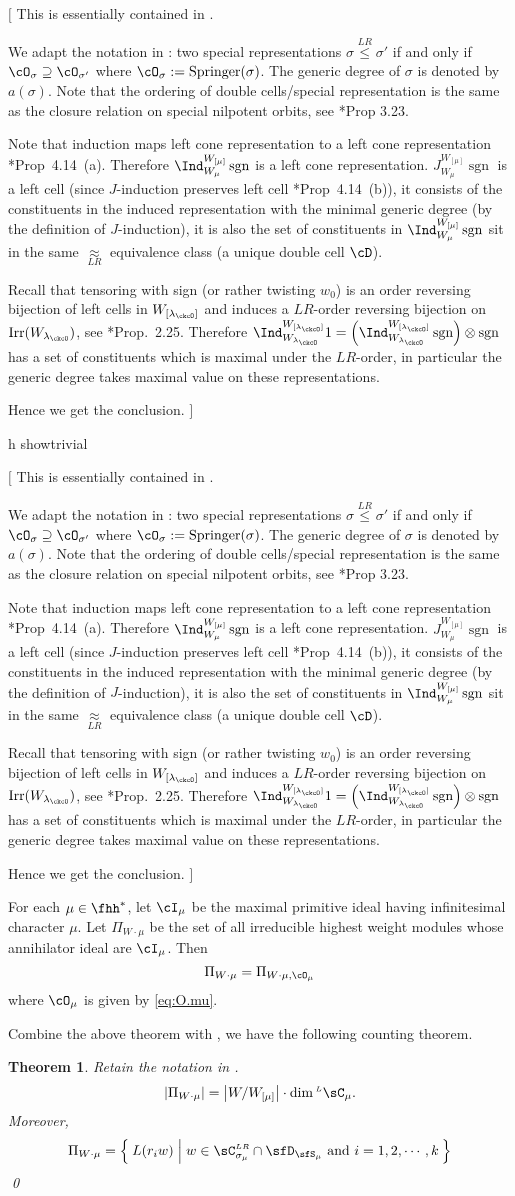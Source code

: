 \documentclass[12pt,a4paper]{amsart}
\newcommand{\trivial}[2][]{\if\relax\detokenize{#1}\relax
  {%
      \color{orange} \vspace{0em} $[$  #2 $]$
      \color{black}
  }
  \else
\ifx#1h
\ifcsname showtrivial\endcsname
{%
    \color{orange} \vspace{0em}  $[$ #2 $]$
    \color{black}
}
\fi
\else {\red Wrong argument!} \fi
\fi
}
\def\abs#1{\left|{#1}\right|}
\newcommand{\sgn}{\operatorname{sgn}}
\newcommand{\LRleq}{\stackrel{LR}{\leq}}
\numberwithin{equation}{section}
\newtheorem{thm}{Theorem}[section]
\theoremstyle{remark}
\def\Irr{\mathrm{Irr}}
\def\lamck{\lambda_\ckcO}
\def\WLamck{W_{[\lambda_{\ckcO}]}}
\def\Wlamck{W_{\lamck}}
\def\CLR{{\sC}^{\scriptscriptstyle LR}}
\def\LC{{}^{\scriptscriptstyle L}\sC}
\def\Spr{\mathrm{Springer}}
\def\approxLR{\mathrel{\mathop{\approx}\limits_{\scriptscriptstyle LR}}}
\begin{document}
\trivial{
  This is essentially contained in \cite{BVUni}.

  We adapt the notation in \cite{BVUni}: two special representations
  $\sigma \LRleq \sigma'$ if and only if $\cO_{\sigma}\supseteq \cO_{\sigma'}$
  where $\cO_{\sigma}:=\Spr(\sigma)$. The generic degree of $\sigma$ is denoted by $a(\sigma)$.
  Note that the ordering of double cells/special representation is the same as the closure relation on special nilpotent orbits, see \cite{BVUni}*{Prop
    3.23}.

  Note that induction maps left cone representation to a left cone
  representation \cite{BVUni}*{Prop~4.14~(a)}. Therefore
  $\Ind_{W_{\mu}}^{W_{[\mu]}}\sgn$ is a left cone representation.
  $J_{W_{\mu}}^{W_{[\mu]}}\sgn$ is a left cell (since $J$-induction preserves
  left cell \cite{BVUni}*{Prop~4.14~(b)}), it consists of the constituents in the induced
  representation with the minimal generic degree (by the definition of
  $J$-induction), it is also the set of constituents in
  $\Ind_{W_{\mu}}^{W_{[\mu]}}\sgn$ sit in the same $\approxLR$ equivalence class (a unique double cell $\cD$).


  Recall that tensoring with sign (or rather twisting $w_{0}$) is an order
  reversing bijection of left cells in $\WLamck$ and induces a $LR$-order
  reversing bijection on $\Irr(\Wlamck)$, see \cite{BV2}*{Prop.~2.25}. Therefore
  $\Ind_{\Wlamck}^{\WLamck} 1 = \left(\Ind_{\Wlamck}^{\WLamck} \sgn\right)\otimes \sgn$
  has a set of constituents which is maximal under the $LR$-order, in particular
  the generic degree takes maximal value on these representations.

  Hence we get the conclusion.
}

For each  $\mu\in \fhh^{*}$,
let $\cI_{\mu}$ be the maximal primitive ideal having infinitesimal character
$\mu$.
Let
  $\Pi_{W\cdot \mu}$ be the set of all irreducible highest weight modules whose
  annihilator ideal are $\cI_{\mu}$.
  Then
  \[
    \Pi_{W\cdot \mu} = \Pi_{W\cdot \mu, \cO_{\mu}}
  \]
  where $\cO_{\mu}$ is given by \eqref{eq:O.mu}.


Combine the above theorem with , we have the following
counting theorem.
\begin{thm}
  Retain the notation in .   \[
    \abs{\Pi_{W\cdot \mu}} = \abs{W/W_{[\mu]}}\cdot
    \dim \LC_{\mu}.
  \]
  Moreover,
  \[
  \Pi_{W\cdot\mu} = \Set{L(r_{i}w)|w\in \CLR_{\sigma_{\mu}}\cap \sfD_{\sfS_{\mu}} \text{ and } i=1,2,\cdots,k}
  \]
  \qed
\end{thm}
\end{document}
